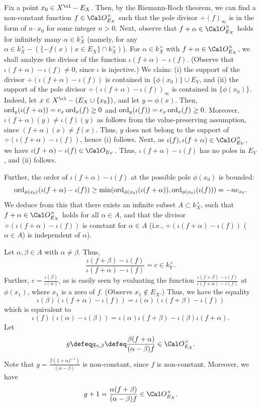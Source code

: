 Fix a point $x_0\in X^{\cl}-E_X$. Then, 
by the Riemann-Roch theorem, we can find a non-constant function
$f\in \Cal O_{E_X}^{\times}$ such that the pole divisor
$\div (f)_{\infty}$ is in the form of $n\cdot x_0$ for 
some integer $n>0$.
Next, observe that $f+\alpha\in \Cal O_{E_X}
^{\times}$ holds for infinitely many $\alpha\in k_X^{\times}$ 
(namely, for any $\alpha \in k_X^{\times}-
(\{-f(x)\mid x\in E_X\}\cap k_X^{\times})$). For 
$\alpha\in k_X^{\times}$ with $f+\alpha\in \Cal O_{E_X}^{\times}$, 
we shall analyze the divisor of the function $\iota (f+\alpha)-\iota (f)$. 
(Observe that $\iota (f+\alpha)-\iota (f)\neq 0$, since 
$\iota$ is injective.) 
We claim: (i) the support of the divisor $\div (\iota (f+\alpha)-\iota (f))$ 
is contained in $\{\phi (x_0)\}\cup E_Y$, and 
(ii) the support of the pole divisor $\div (\iota (f+\alpha)-\iota (f))_\infty$ 
is contained in $\{\phi (x_0)\}$. 
Indeed, let $x\in  X^{\cl}-(E_X\cup \{x_0\})$, and let 
$y=\phi (x)$. Then, $\operatorname {ord} _y(\iota(f+\alpha))=e_x\operatorname {ord}_x(f)\ge 0$ and 
$\operatorname {ord} _y(\iota(f))=e_x\operatorname {ord}_x(f)\ge 0$. 
Moreover, $\iota (f+\alpha)(y)\neq \iota (f)(y)$ as 
follows from the value-preserving assumption, since 
$(f+\alpha)(x)\neq f(x)$. Thus, $y$ does not belong to the support of 
$\div(\iota (f+\alpha)-\iota (f))$,
hence (i) follows. Next, as $\iota(f), \iota(f+\alpha)\in \Cal O_{E_Y}^{\times}$, 
we have $\iota (f+\alpha)-\iota (f)\in \Cal O_{E_Y}$. Thus, 
$\iota (f+\alpha)-\iota (f)$ has no poles in $E_Y$, and (ii) follows. 

Further, the order of $\iota (f+\alpha)-\iota (f)$ 
at the possible pole $\phi (x_0)$ is bounded: 
$$\operatorname {ord} _{\phi (x_0)} (\iota (f+\alpha)-\iota (f))
\geq \min (\operatorname {ord} _{\phi (x_0)} (\iota (f+\alpha)), \operatorname {ord}_{\phi(x_0)}(\iota (f)))
=-n e_{x_0}.$$
We deduce from this 
that there exists an infinite subset $A\subset k_X^{\times}$,
such that $f+\alpha\in \Cal O_{E_X}^{\times}$ holds for all $\alpha\in A$, 
and that the divisor $\div (\iota (f+\alpha)-\iota (f))$ 
is constant for $\alpha\in A$ (i.e., $\div (\iota (f+\alpha)-\iota (f))$ 
($\alpha\in A$) is independent of $\alpha$). 

Let $\alpha, \beta \in A$ with $\alpha\neq\beta$. Thus, 
$$\frac {\iota (f+\beta)-\iota (f)} {\iota (f+\alpha)-\iota (f)}=c \in k_Y^{\times}.$$ 
Further, $c=\frac {\iota (\beta)}{\iota (\alpha)}$, as is easily seen 
by evaluating the function
$\frac {\iota (f+\beta)-\iota (f)} {\iota (f+\alpha)-\iota (f)}$ 
at $\phi (x_1)$, where $x_1$ is a zero of $f$. 
(Observe $x_1\notin E_X$.) 
Thus, we have the equality
$$\iota (\beta) (\iota (f+\alpha)-\iota (f))=\iota (\alpha) (\iota (f+\beta)-
\iota (f))$$ 
which is equivalent to
$$\iota (f)(\iota (\alpha)-\iota (\beta))=\iota (\alpha)\iota (f+\beta)-
\iota (\beta)\iota (f+\alpha).\tag {$*$}$$
Let 
$$g\defeq g_{\alpha,\beta}
\defeq\frac {\beta(f+\alpha)}{(\alpha-\beta)f}\in \Cal O_{E_X}^{\times}.$$ 
Note that $g=\frac{\beta (1+\alpha f^{-1})}{(\alpha-\beta)}$ 
is non-constant, since $f$ is non-constant.
Moreover, we have 
$$g+1=\frac {\alpha(f+\beta)}{(\alpha-\beta)f}\in \Cal O_{E_X}^{\times}.$$ 

